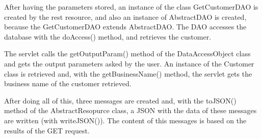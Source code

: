 After having the parameters stored, an instance of the class GetCustomerDAO is created by the rest resource, and also an instance of AbstractDAO is created, because the GetCustomerDAO extends AbstractDAO. The DAO accesses the database with the doAccess() method, and retrieves the customer.

The servlet calls the getOutputParam() method of the DataAccessObject class and gets the output parameters asked by the user. An instance of the Customer class is retrieved and, with the getBusinessName() method, the servlet gets the business name of the customer retrieved.

After doing all of this, three messages are created and, with the toJSON() method of the AbstractResopurce class, a JSON with the data of these messages are written (with writeJSON()). The content of this messages is based on the results of the GET request.